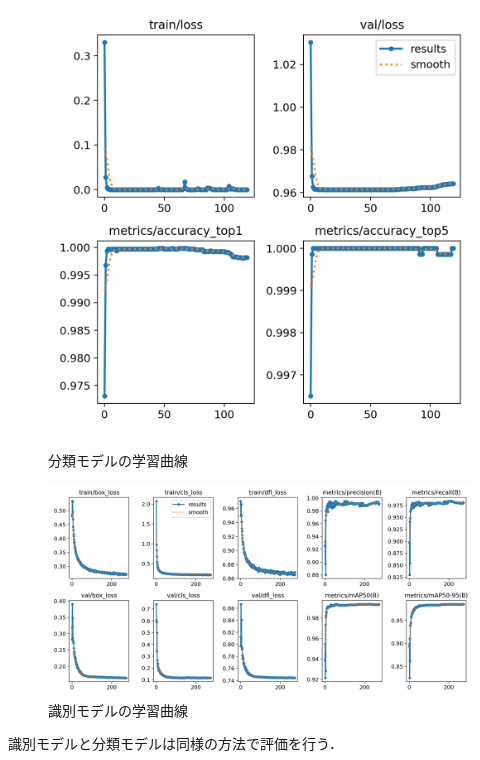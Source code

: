 \begin{figure}[htbp]
	\begin{minipage}[b]{0.28\linewidth}
		\centering
		\includegraphics[width=\linewidth]{fig/results_cls.png}
		\caption{分類モデルの学習曲線}
	\end{minipage}
	\begin{minipage}[b]{0.6\linewidth}
		\centering
		\includegraphics[width=\linewidth]{fig/results_det.png}
		\caption{識別モデルの学習曲線}
	\end{minipage}
\end{figure}
識別モデルと分類モデルは同様の方法で評価を行う．
